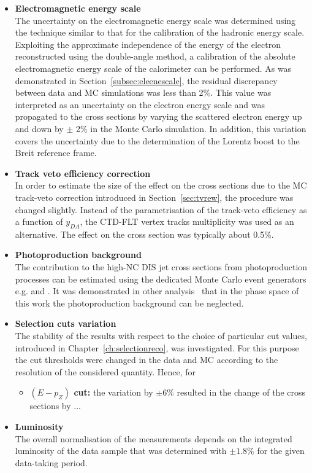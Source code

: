 \begin{itemize}
	\item \textbf{Electromagnetic energy scale}\\
		The uncertainty on the electromagnetic energy scale was determined using the technique similar to that for the calibration of the hadronic energy scale. Exploiting the approximate independence of the energy of the electron reconstructed using the double-angle method, a calibration of the absolute electromagnetic energy scale of the calorimeter can be performed. As was demonstrated in Section~\ref{subsec:eleenescale}, the residual discrepancy between data and MC simulations was less than 2\%. This value was interpreted as an uncertainty on the electron energy scale and was propagated to the cross sections by varying the scattered electron energy up and down by $\pm$ 2\% in the Monte Carlo simulation. In addition, this variation covers the uncertainty due to the determination of the Lorentz boost to the Breit reference frame. 
	
	\item \textbf{Track veto efficiency correction}\\
		In order to estimate the size of the effect on the cross sections due to the MC track-veto correction introduced in Section~\ref{sec:tvrew}, the procedure was changed slightly. Instead of the parametrisation of the track-veto efficiency as a function of $y_{DA}$, the CTD-FLT vertex tracks multiplicity was used as an alternative. The effect on the cross section was typically about 0.5\%.
	
	\item \textbf{Photoproduction background}\\
		The contribution to the high-\qsq NC DIS jet cross sections from photoproduction processes can be estimated using the dedicated Monte Carlo event generators e.g. \pythia and \herwig. It was demonstrated in other analysis~\cite{federike,trewor} that in the phase space of this work the photoproduction background can be neglected.
	
	\item \textbf{Selection cuts variation} \\
		The stability of the results with respect to the choice of particular cut values, introduced in Chapter~\ref{ch:selectionreco}, was investigated. For this purpose the cut thresholds were changed in the data and MC according to the resolution of the considered quantity. Hence, for 
		\begin{itemize}
			\item \textbf{$\left( E-p_Z\right) $ cut:} the variation by $\pm6\%$ resulted in the change of the cross sections by ...
		\end{itemize}
	\item \textbf{Luminosity} \\
		The overall normalisation of the measurements depends on the integrated luminosity of the data sample that was determined with $\pm1.8\%$ for the given data-taking period.
\end{itemize}
